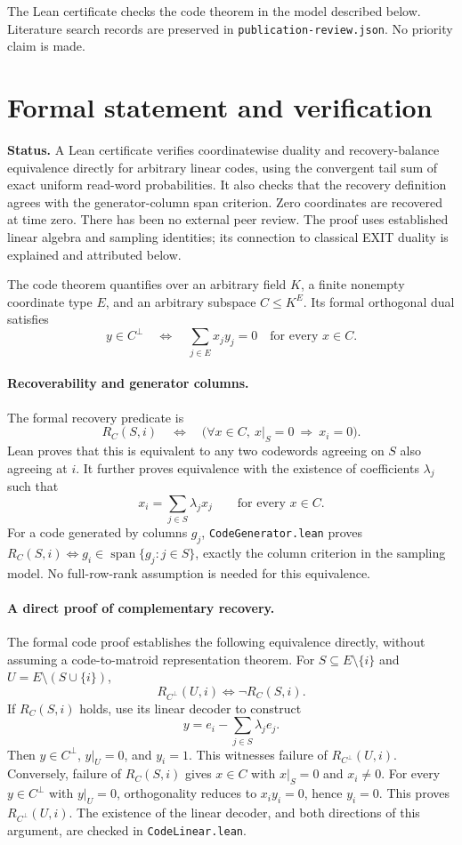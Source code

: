 \documentclass[11pt]{article}
\theoremstyle{remark}
\newcommand{\spn}{\operatorname{span}}
\begin{document}
The Lean certificate checks the code theorem in the model described below.
Literature search records are preserved in \texttt{publication-review.json}.
No priority claim is made.

\appendix
\section{Formal statement and verification}
\noindent\textbf{Status.} A Lean certificate verifies coordinatewise duality
and recovery-balance equivalence directly for arbitrary linear codes, using
the convergent tail sum of exact uniform read-word probabilities. It also
checks that the recovery definition agrees with the generator-column span
criterion. Zero coordinates are recovered at time zero. There has been no
external peer review. The proof uses established linear algebra and
sampling identities; its connection to classical EXIT duality is explained
and attributed below.

The code theorem quantifies over an arbitrary field $K$, a finite nonempty
coordinate type $E$, and an arbitrary subspace $C\leq K^E$.
Its formal orthogonal dual satisfies
\[
 y\in C^\perp\quad\Longleftrightarrow\quad
           \sum_{j\in E}x_jy_j=0\quad\text{for every }x\in C.
\]

\paragraph{Recoverability and generator columns.}
The formal recovery predicate is
\[
 R_C(S,i)\quad\Longleftrightarrow\quad
 \bigl(\forall x\in C,\ x|_S=0\ \Longrightarrow\ x_i=0\bigr).
\]
Lean proves that this is equivalent to any two codewords agreeing on $S$
also agreeing at $i$. It further proves equivalence with the existence of
coefficients $\lambda_j$ such that
\[
                   x_i=\sum_{j\in S}\lambda_j x_j
                   \qquad\text{for every }x\in C.
\]
For a code generated by columns $g_j$, \texttt{CodeGenerator.lean} proves
$R_C(S,i)\Longleftrightarrow g_i\in\spn\{g_j:j\in S\}$, exactly the column
criterion in the sampling model. No full-row-rank assumption is needed for
this equivalence.

\paragraph{A direct proof of complementary recovery.}
The formal code proof establishes the following equivalence directly,
without assuming a code-to-matroid representation theorem. For
$S\subseteq E\setminus\{i\}$ and $U=E\setminus(S\cup\{i\})$,
\[
                        R_{C^\perp}(U,i)\Longleftrightarrow\neg R_C(S,i).
\]
If $R_C(S,i)$ holds, use its linear decoder to construct
\[
                         y=e_i-\sum_{j\in S}\lambda_j e_j.
\]
Then $y\in C^\perp$, $y|_U=0$, and $y_i=1$. This witnesses failure of
$R_{C^\perp}(U,i)$. Conversely, failure of $R_C(S,i)$ gives $x\in C$ with
$x|_S=0$ and $x_i\ne0$. For every $y\in C^\perp$ with $y|_U=0$,
orthogonality reduces to $x_iy_i=0$, hence $y_i=0$. This proves
$R_{C^\perp}(U,i)$. The existence of the linear decoder, and both directions
of this argument, are checked in \texttt{CodeLinear.lean}.
\end{document}
